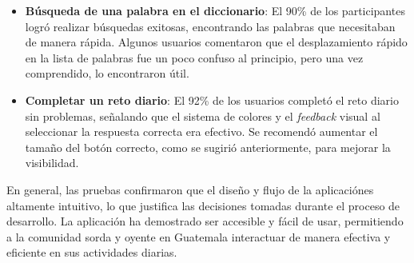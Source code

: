 \begin{itemize}
    \item \textbf{Búsqueda de una palabra en el diccionario}: El 90\% de los participantes logró realizar búsquedas exitosas, encontrando las palabras que necesitaban de manera rápida. Algunos usuarios comentaron que el desplazamiento rápido en la lista de palabras fue un poco confuso al principio, pero una vez comprendido, lo encontraron útil.
    \item \textbf{Completar un reto diario}: El 92\% de los usuarios completó el reto diario sin problemas, señalando que el sistema de colores y el \textit{feedback} visual al seleccionar la respuesta correcta era efectivo. Se recomendó aumentar el tamaño del botón correcto, como se sugirió anteriormente, para mejorar la visibilidad.
\end{itemize}


En general, las pruebas confirmaron que el diseño y flujo de la aplicaciónes altamente intuitivo, lo que justifica las decisiones tomadas durante el proceso de desarrollo. La aplicación ha demostrado ser accesible y fácil de usar, permitiendo a la comunidad sorda y oyente en Guatemala interactuar de manera efectiva y eficiente en sus actividades diarias.
